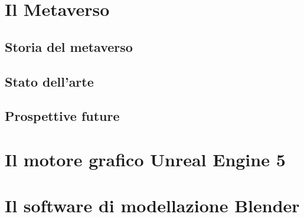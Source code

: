 


\section{Il Metaverso} %

    \subsection{Storia del metaverso}

    \subsection{Stato dell'arte}

    \subsection{Prospettive future}

\section{Il motore grafico Unreal Engine 5}

\section{Il software di modellazione Blender}










